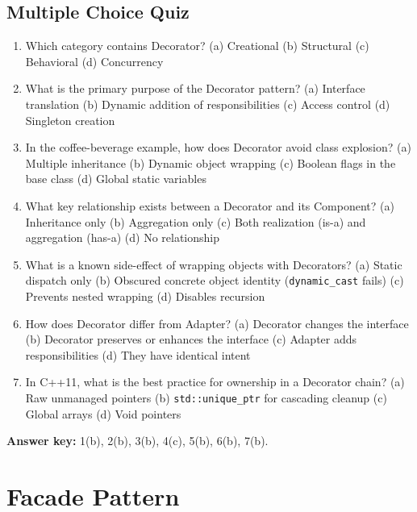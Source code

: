 \documentclass[11pt,a4paper]{report}
\begin{document}
\section{Multiple Choice Quiz}
\begin{enumerate}
  \item Which category contains Decorator?\quad
  (a) Creational \quad (b) Structural \quad (c) Behavioral \quad (d) Concurrency
  \item What is the primary purpose of the Decorator pattern?\quad
  (a) Interface translation \quad (b) Dynamic addition of responsibilities \quad
  (c) Access control \quad (d) Singleton creation
  \item In the coffee-beverage example, how does Decorator avoid class explosion?\quad
  (a) Multiple inheritance \quad (b) Dynamic object wrapping \quad
  (c) Boolean flags in the base class \quad (d) Global static variables
  \item What key relationship exists between a Decorator and its Component?\quad
  (a) Inheritance only \quad (b) Aggregation only \quad
  (c) Both realization (is-a) and aggregation (has-a) \quad (d) No relationship
  \item What is a known side-effect of wrapping objects with Decorators?\quad
  (a) Static dispatch only \quad (b) Obscured concrete object identity (\texttt{dynamic\_cast} fails) \quad
  (c) Prevents nested wrapping \quad (d) Disables recursion
  \item How does Decorator differ from Adapter?\quad
  (a) Decorator changes the interface \quad (b) Decorator preserves or enhances the interface \quad
  (c) Adapter adds responsibilities \quad (d) They have identical intent
  \item In C++11, what is the best practice for ownership in a Decorator chain?\quad
  (a) Raw unmanaged pointers \quad (b) \texttt{std::unique\_ptr} for cascading cleanup \quad
  (c) Global arrays \quad (d) Void pointers
\end{enumerate}
\textbf{Answer key:} 1(b), 2(b), 3(b), 4(c), 5(b), 6(b), 7(b).

\chapter{Facade Pattern}
\end{document}
